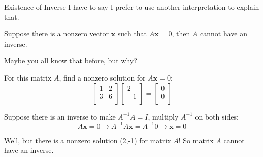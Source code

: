 \documentclass{beamer}
\begin{document}
\begin{frame}{Existence of Inverse}
I have to say I prefer to use another interpretation to explain that.

\begin{theorem}
Suppose there is a nonzero vector $\mathbf{x}$ such that $A\mathbf{x}=0$, then $A$ cannot have an inverse.
\end{theorem}

Maybe you all know that before, but why?

For this matrix $A$, find a nonzero solution for $A\mathbf{x}=0$:
\begin{equation*}
    \left[ \begin{matrix}
        1&		2\\
        3&		6\\
    \end{matrix} \right] \left[ \begin{array}{c}
        2\\
        -1\\
    \end{array} \right] =\left[ \begin{array}{c}
        0\\
        0\\
    \end{array} \right]
\end{equation*}

Suppose there is an inverse to make $A^{-1}A=I$, multiply $A^{-1}$ on both sides:
\begin{equation*}
    A\mathbf{x}=0\rightarrow A^{-1}A\mathbf{x}=A^{-1}0\rightarrow \mathbf{x}=0
\end{equation*}

Well, but there is a nonzero solution (2,-1) for matrix $A$! So matrix $A$ cannot have an inverse.
\end{frame}
\end{document}
